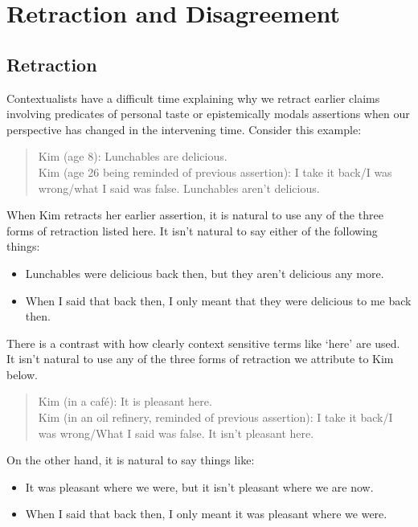 \documentclass[
  11pt,
  letterpaper,
  DIV=11,
  numbers=noendperiod,
  twoside]{scrartcl}
\providecommand{\tightlist}{%
  \setlength{\itemsep}{0pt}\setlength{\parskip}{0pt}}
\begin{document}
\section{Retraction and Disagreement}\label{retractionanddisagreement}

\subsection{Retraction}\label{retraction}

Contextualists have a difficult time explaining why we retract earlier
claims involving predicates of personal taste or epistemically modals
assertions when our perspective has changed in the intervening time.
Consider this example:

\begin{quote}
Kim (age 8): Lunchables are delicious.\\
Kim (age 26 being reminded of previous assertion): I take it back/I was
wrong/what I said was false. Lunchables aren't delicious.
\end{quote}

When Kim retracts her earlier assertion, it is natural to use any of the
three forms of retraction listed here. It isn't natural to say either of
the following things:

\begin{itemize}
\tightlist
\item
  Lunchables were delicious back then, but they aren't delicious any
  more.
\item
  When I said that back then, I only meant that they were delicious to
  me back then.
\end{itemize}

There is a contrast with how clearly context sensitive terms like `here'
are used. It isn't natural to use any of the three forms of retraction
we attribute to Kim below.

\begin{quote}
Kim (in a café): It is pleasant here.\\
Kim (in an oil refinery, reminded of previous assertion): I take it
back/I was wrong/What I said was false. It isn't pleasant here.
\end{quote}

On the other hand, it is natural to say things like:

\begin{itemize}
\tightlist
\item
  It was pleasant where we were, but it isn't pleasant where we are now.
\item
  When I said that back then, I only meant it was pleasant where we
  were.
\end{itemize}
\end{document}
